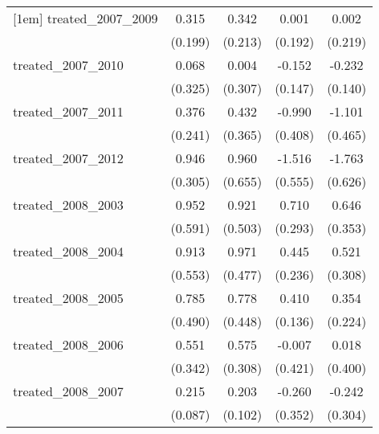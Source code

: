 {\begin{tabular}{l*{4}{c}}
[1em]
treated\_2007\_2009&       0.315         &       0.342         &       0.001         &       0.002         \\
            &     (0.199)         &     (0.213)         &     (0.192)         &     (0.219)         \\
[1em]
treated\_2007\_2010&       0.068         &       0.004         &      -0.152         &      -0.232         \\
            &     (0.325)         &     (0.307)         &     (0.147)         &     (0.140)         \\
[1em]
treated\_2007\_2011&       0.376         &       0.432         &      -0.990\sym{*}  &      -1.101\sym{*}  \\
            &     (0.241)         &     (0.365)         &     (0.408)         &     (0.465)         \\
[1em]
treated\_2007\_2012&       0.946\sym{**} &       0.960         &      -1.516\sym{**} &      -1.763\sym{**} \\
            &     (0.305)         &     (0.655)         &     (0.555)         &     (0.626)         \\
[1em]
treated\_2008\_2003&       0.952         &       0.921         &       0.710\sym{*}  &       0.646         \\
            &     (0.591)         &     (0.503)         &     (0.293)         &     (0.353)         \\
[1em]
treated\_2008\_2004&       0.913         &       0.971\sym{*}  &       0.445         &       0.521         \\
            &     (0.553)         &     (0.477)         &     (0.236)         &     (0.308)         \\
[1em]
treated\_2008\_2005&       0.785         &       0.778         &       0.410\sym{**} &       0.354         \\
            &     (0.490)         &     (0.448)         &     (0.136)         &     (0.224)         \\
[1em]
treated\_2008\_2006&       0.551         &       0.575         &      -0.007         &       0.018         \\
            &     (0.342)         &     (0.308)         &     (0.421)         &     (0.400)         \\
[1em]
treated\_2008\_2007&       0.215\sym{*}  &       0.203\sym{*}  &      -0.260         &      -0.242         \\
            &     (0.087)         &     (0.102)         &     (0.352)         &     (0.304)         \\

\end{tabular}}
